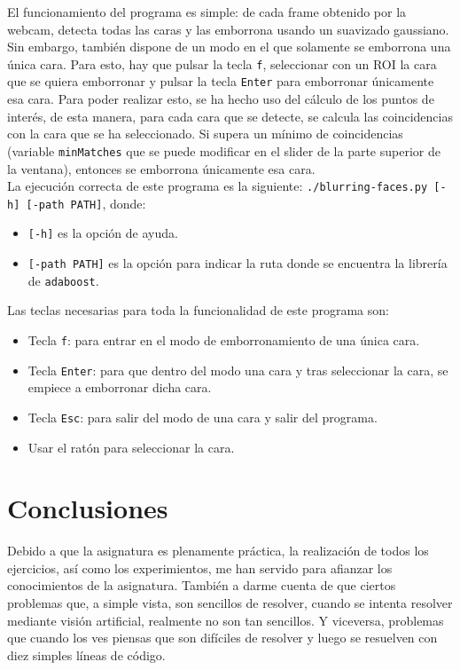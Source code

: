 \documentclass[a4paper,10pt,titlepage,oneside,openright]{book}
\begin{document}
El funcionamiento del programa es simple: de cada frame obtenido por la webcam, detecta todas las caras y las emborrona usando un suavizado gaussiano. Sin embargo, también dispone de un modo en el que solamente se emborrona una única cara. Para esto, hay que pulsar la tecla \texttt{f}, seleccionar con un ROI la cara que se quiera emborronar y pulsar la tecla \texttt{Enter} para emborronar únicamente esa cara. Para poder realizar esto, se ha hecho uso del cálculo de los puntos de interés, de esta manera, para cada cara que se detecte, se calcula las coincidencias con la cara que se ha seleccionado. Si supera un mínimo de coincidencias (variable \texttt{minMatches} que se puede modificar en el slider de la parte superior de la ventana), entonces se emborrona únicamente esa cara. \\

La ejecución correcta de este programa es la siguiente: \texttt{./blurring-faces.py [-h] [-path PATH]}, donde:
\begin{itemize}
 \item \texttt{[-h]} es la opción de ayuda.
 \item \texttt{[-path PATH]} es la opción para indicar la ruta donde se encuentra la librería de \texttt{adaboost}.
\end{itemize}

Las teclas necesarias para toda la funcionalidad de este programa son:
\begin{itemize}
 \item Tecla \texttt{f}: para entrar en el modo de emborronamiento de una única cara.
 \item Tecla \texttt{Enter}: para que dentro del modo una cara y tras seleccionar la cara, se empiece a emborronar dicha cara.
 \item Tecla \texttt{Esc}: para salir del modo de una cara y salir del programa.
 \item Usar el ratón para seleccionar la cara.
\end{itemize}



\medskip
\section{Conclusiones}
Debido a que la asignatura es plenamente práctica, la realización de todos los ejercicios, así como los experimientos, me han servido para afianzar los conocimientos de la asignatura. También a darme cuenta de que ciertos problemas que, a simple vista, son sencillos de resolver, cuando se intenta resolver mediante visión artificial, realmente no son tan sencillos. Y viceversa, problemas que cuando los ves piensas que son difíciles de resolver y luego se resuelven con diez simples líneas de código. \\
\end{document}
